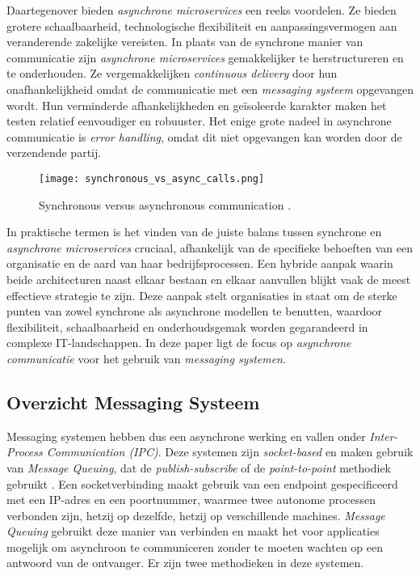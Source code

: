 Daartegenover bieden \emph{asynchrone microservices} een reeks voordelen. Ze bieden grotere schaalbaarheid, technologische 
flexibiliteit en aanpassingsvermogen aan veranderende zakelijke vereisten. 
In plaats van de synchrone manier van communicatie zijn \emph{asynchrone microservices} 
gemakkelijker te herstructureren en te onderhouden. 
Ze vergemakkelijken \emph{continuous delivery} door hun onafhankelijkheid omdat de communicatie 
met een \emph{messaging systeem} opgevangen wordt. Hun verminderde afhankelijkheden en 
geïsoleerde karakter maken het testen relatief eenvoudiger en robuuster.
Het enige grote nadeel in asynchrone communicatie is \emph{error handling}, 
omdat dit niet opgevangen kan worden door de verzendende partij.
\newline

\begin{figure}[H]
  \centering
  \texttt{[image: synchronous\_vs\_async\_calls.png]}
  \caption{\label{fig:img}Synchronous versus asynchronous communication \autocite[figure 14 -- 13]{MarkRichards2021}.}
\end{figure}

In praktische termen is het vinden van de juiste balans tussen synchrone en \emph{asynchrone microservices} cruciaal, 
afhankelijk van de specifieke behoeften van een organisatie en de aard van haar bedrijfsprocessen. 
Een hybride aanpak waarin beide architecturen naast elkaar bestaan en elkaar aanvullen blijkt vaak de meest effectieve strategie te zijn. 
Deze aanpak stelt organisaties in staat om de sterke punten van zowel synchrone als asynchrone modellen te benutten, 
waardoor flexibiliteit, schaalbaarheid en onderhoudsgemak worden gegarandeerd in complexe \newline IT-landschappen.
In deze paper ligt de focus op \emph{asynchrone communicatie} voor het gebruik van \emph{messaging systemen}.
\newline

\subsection{Overzicht Messaging Systeem}
Messaging systemen hebben dus een asynchrone werking en vallen onder \newline \emph{Inter-Process Communication (IPC)}. 
Deze systemen zijn \emph{socket-based} en maken gebruik van \emph{Message Queuing}, dat de \emph{publish-subscribe} of de \emph{point-to-point} methodiek gebruikt \autocite{Dinari2020}. 
\newline
Een socketverbinding maakt gebruik van een endpoint gespecificeerd met een IP-adres en een \newline poortnummer, 
waarmee twee autonome processen verbonden zijn, hetzij op dezelfde, hetzij op verschillende machines.
\newline
\emph{Message Queuing} gebruikt deze manier van verbinden en maakt het voor applicaties mogelijk om asynchroon 
te communiceren zonder te moeten wachten op een antwoord van de ontvanger. 
Er zijn twee methodieken in deze systemen. 
\newline

